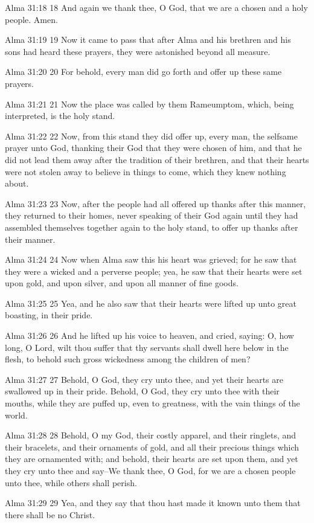 Alma 31:18
 18 And again we thank thee, O God, that we are a chosen and a
holy people. Amen.

Alma 31:19
 19 Now it came to pass that after Alma and his brethren and his
sons had heard these prayers, they were astonished beyond all
measure.

Alma 31:20
 20 For behold, every man did go forth and offer up these same
prayers.

Alma 31:21
 21 Now the place was called by them Rameumptom, which, being
interpreted, is the holy stand.

Alma 31:22
 22 Now, from this stand they did offer up, every man, the
selfsame prayer unto God, thanking their God that they were
chosen of him, and that he did not lead them away after the
tradition of their brethren, and that their hearts were not
stolen away to believe in things to come, which they knew nothing
about.

Alma 31:23
 23 Now, after the people had all offered up thanks after this
manner, they returned to their homes, never speaking of their God
again until they had assembled themselves together again to the
holy stand, to offer up thanks after their manner.

Alma 31:24
 24 Now when Alma saw this his heart was grieved; for he saw that
they were a wicked and a perverse people; yea, he saw that their
hearts were set upon gold, and upon silver, and upon all manner
of fine goods.

Alma 31:25
 25 Yea, and he also saw that their hearts were lifted up unto
great boasting, in their pride.

Alma 31:26
 26 And he lifted up his voice to heaven, and cried, saying: O,
how long, O Lord, wilt thou suffer that thy servants shall dwell
here below in the flesh, to behold such gross wickedness among
the children of men?

Alma 31:27
 27 Behold, O God, they cry unto thee, and yet their hearts are
swallowed up in their pride. Behold, O God, they cry unto thee
with their mouths, while they are puffed up, even to greatness,
with the vain things of the world.

Alma 31:28
 28 Behold, O my God, their costly apparel, and their ringlets,
and their bracelets, and their ornaments of gold, and all their
precious things which they are ornamented with; and behold, their
hearts are set upon them, and yet they cry unto thee and say--We
thank thee, O God, for we are a chosen people unto thee, while
others shall perish.

Alma 31:29
 29 Yea, and they say that thou hast made it known unto them that
there shall be no Christ.

